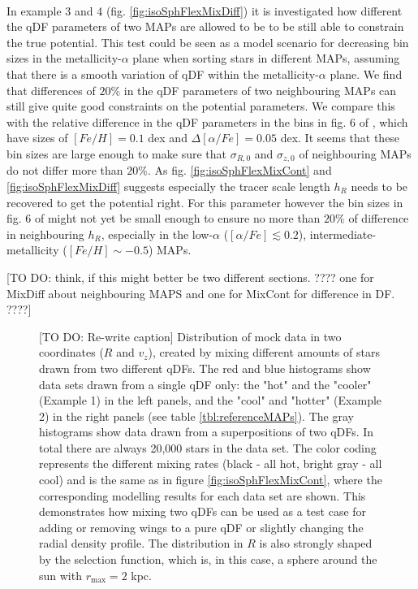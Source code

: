 \\In example 3 and 4 (fig. \ref{fig:isoSphFlexMixDiff}) it is investigated how different the qDF parameters of two MAPs are allowed to be to be still able to constrain the true potential. This test could be seen as a model scenario for decreasing bin sizes in the metallicity-$\alpha$ plane when sorting stars in different MAPs, assuming that there is a smooth variation of qDF within the metallicity-$\alpha$ plane. We find that differences of $20\%$ in the qDF parameters of two neighbouring MAPs can still give quite good constraints on the potential parameters. We compare this with the relative difference in the qDF parameters in the bins in fig. 6 of \cite{bov13}, which have sizes of $[Fe/H] = 0.1$ dex and $\Delta [\alpha/Fe] = 0.05$ dex. It seems that these bin sizes are large enough to make sure that $\sigma_{R,0}$ and $\sigma_{z,0}$ of neighbouring MAPs do not differ more than $20\%$. As fig. \ref{fig:isoSphFlexMixCont} and \ref{fig:isoSphFlexMixDiff} suggests especially the tracer scale length $h_R$ needs to be recovered to get the potential right. For this parameter however the bin sizes in fig. 6 of \cite{bov13} might not yet be small enough to ensure no more than $20\%$ of difference in neighbouring $h_R$, especially in the low-$\alpha$ ($[\alpha/Fe] \lesssim 0.2$), intermediate-metallicity ($[Fe/H] \sim -0.5$) MAPs.

[TO DO: think, if this might better be two different sections. ???? one for MixDiff about neighbouring MAPS and one for MixCont for difference in DF. ????]



\begin{figure}
\caption{[TO DO: Re-write caption] Distribution of mock data in two coordinates ($R$ and $v_z$), created by mixing different amounts of stars drawn from two different qDFs. The red and blue histograms show data sets drawn from a single qDF only: the "hot" and the "cooler" \MAPs (Example 1) in the left panels, and the "cool" and "hotter" \MAPs (Example 2) in the right panels (see table \ref{tbl:referenceMAPs}). The gray histograms show data drawn from a superpositions of two qDFs. In total there are always 20,000 stars in the data set. The color coding represents the different mixing rates (black - all hot, bright gray - all cool) and is the same as in figure \ref{fig:isoSphFlexMixCont}, where the corresponding modelling results for each data set are shown. This demonstrates how mixing two qDFs can be used as a test case for adding or removing wings to a pure qDF or slightly changing the radial density profile. The distribution in $R$ is also strongly shaped by the selection function, which is, in this case, a sphere around the sun with $r_\text{max}=2$ kpc.}
\label{fig:isoSphFlexMixCont_mockdata}
\end{figure}

